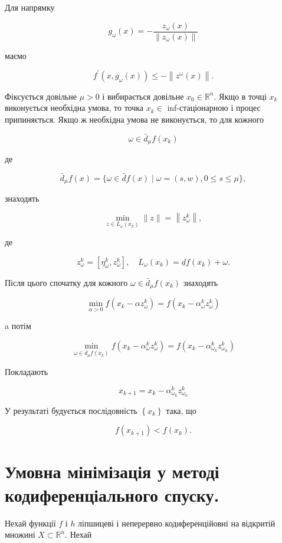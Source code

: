 \documentclass[10pt]{article}
\begin{document}
Для напрямку

$$
g_{\omega}(x)=-\frac{z_{\omega}(x)}{\left\|z_{\omega}(x)\right\|}
$$

маємо

$$
f^{\prime}\left(x, g_{\omega}(x)\right) \leq-\left\|z^{\omega}(x)\right\| .
$$

Фіксується довільне $\mu>0$ і вибирається довільне $x_{0} \in \mathbb{R}^{n}$. Якщо в точці $x_{k}$ виконується необхідна умова, то точка $x_{k} \in$ inf-стаціонарною і процес припиняється. Якщо ж необхідна умова не виконується, то для кожного

$$
\omega \in \bar{d}_{\mu} f\left(x_{k}\right)
$$

де

$$
\bar{d}_{\mu} f(x)=\{\omega \in \bar{d} f(x) \mid \omega=(s, w), 0 \leq s \leq \mu\},
$$

знаходять

$$
\min _{z \in L_{\omega}\left(x_{k}\right)}\|z\|=\left\|z_{\omega}^{k}\right\|,
$$

де

$$
z_{\omega}^{k}=\left[\eta_{\omega}^{k}, z_{\omega}^{k}\right], \quad L_{\omega}\left(x_{k}\right)=\underline{d} f\left(x_{k}\right)+\omega .
$$

Після цього спочатку для кожного $\omega \in \bar{d}_{\mu} f\left(x_{k}\right)$ знаходять

$$
\min _{\alpha>0} f\left(x_{k}-\alpha z_{\omega}^{k}\right)=f\left(x_{k}-\alpha_{\omega}^{k} z_{\omega}^{k}\right)
$$

a потім

$$
\min _{\omega \in \bar{d}_{\mu} f\left(x_{k}\right)} f\left(x_{k}-\alpha_{\omega}^{k} z_{\omega}^{k}\right)=f\left(x_{k}-\alpha_{\omega_{k}}^{k} z_{\omega_{k}}^{k}\right)
$$

Покладають

$$
x_{k+1}=x_{k}-\alpha_{\omega_{k}}^{k} z_{\omega_{k}}^{k}
$$

У результаті будується послідовність $\left\{x_{k}\right\}$ така, що

$$
f\left(x_{k+1}\right)<f\left(x_{k}\right) .
$$

\section*{Умовна мінімізація у методі кодиференціального спуску.}
Нехай функції $f$ і $h$ ліпшицеві і неперервно кодиференційовні на відкритій множині $X \subset \mathbb{R}^{n}$. Нехай
\end{document}
